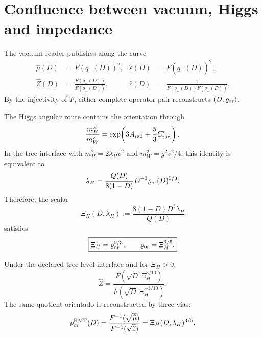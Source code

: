 \section{Confluence between vacuum, Higgs and impedance}

The vacuum reader publishes along the curve
\begin{align}
 \widehat\mu(D)&=F(q_-(D))^2,
 &\widehat\varepsilon(D)&=F(q_+(D))^2,
 \label{rm:eq:curve-vacuum-D}\\
 \widehat Z(D)&=\frac{F(q_-(D))}{F(q_+(D))},
 &\widehat c(D)&=\frac1{F(q_-(D))F(q_+(D))}.
 \label{rm:eq:curve-Z-c-D}
\end{align}
By the injectivity of \(F\), either complete operator pair
reconstructs \((D,\varrho_{\rm or})\).

The Higgs angular route contains the orientation through
\begin{equation}
 \frac{m_H^{\angle}}{m_W^{\angle}}
 =\exp\!\left(3A_{\rm rad}+\frac53C^*_{\rm rad}\right).
 \label{rm:eq:curve-HW-ratio}
\end{equation}
In the tree interface with
\(m_H^2=2\lambda_Hv^2\) and \(m_W^2=g^2v^2/4\), this identity is equivalent to
\begin{equation}
 \lambda_H
 =\frac{Q(D)}{8(1-D)}D^{-3}
  \varrho_{\rm or}(D)^{5/3}.
 \label{rm:eq:curve-lambda-H}
\end{equation}
Therefore, the scalar
\begin{equation}
 \Xi_H(D,\lambda_H)
 :=\frac{8(1-D)D^3\lambda_H}{Q(D)}
 \label{rm:eq:curve-Xi-H}
\end{equation}
satisfies
\begin{equation}
 \boxed{
 \Xi_H=\varrho_{\rm or}^{5/3},
 \qquad
 \varrho_{\rm or}=\Xi_H^{3/5}.}
 \label{rm:eq:curve-Higgs-rho}
\end{equation}

\begin{corollary}
\label{rm:cor:curve-Higgs-impedance}
Under the declared tree-level interface and for \(\Xi_H>0\),
\begin{equation}
 \boxed{
 \widehat Z
 =\frac{
 F\!\left(\sqrt D\,\Xi_H^{3/10}\right)}
 {F\!\left(\sqrt D\,\Xi_H^{-3/10}\right)}.}
 \label{rm:eq:curve-Higgs-Z}
\end{equation}
The same quotient orientado is reconstructed by three vias:
\begin{equation}
 \varrho_{\rm or}^{\rm HMT}(D)
 =\frac{F^{-1}(\sqrt{\widehat\mu})}
        {F^{-1}(\sqrt{\widehat\varepsilon})}
 =\Xi_H(D,\lambda_H)^{3/5}.
 \label{rm:eq:curve-triple-confluence}
\end{equation}
\end{corollary}

